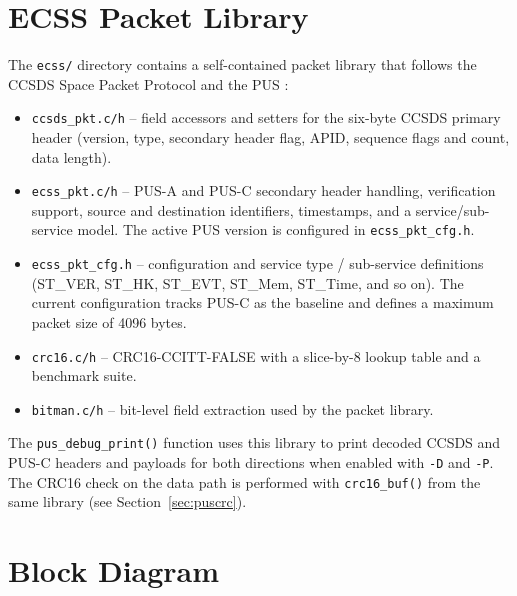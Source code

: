 \section{ECSS Packet Library}

The \texttt{ecss/} directory contains a self-contained packet library that
follows the CCSDS Space Packet Protocol \cite{CCSDS133} and the \gls{PUS}
\cite{ECSS7041C}:

\begin{itemize}

\item \texttt{ccsds\_pkt.c/h} -- field accessors and setters for the
six-byte CCSDS primary header (version, type, secondary header flag, APID,
sequence flags and count, data length).\\

\item \texttt{ecss\_pkt.c/h} -- PUS-A and PUS-C secondary header handling,
verification support, source and destination identifiers, timestamps, and a
service/sub-service model. The active PUS version is configured in
\texttt{ecss\_pkt\_cfg.h}.\\

\item \texttt{ecss\_pkt\_cfg.h} -- configuration and service type /
sub-service definitions (ST\_VER, ST\_HK, ST\_EVT, ST\_Mem, ST\_Time, and so
on). The current configuration tracks PUS-C as the baseline and defines a
maximum packet size of 4096 bytes.\\

\item \texttt{crc16.c/h} -- CRC16-CCITT-FALSE with a slice-by-8 lookup table
and a benchmark suite.\\

\item \texttt{bitman.c/h} -- bit-level field extraction used by the packet
library.\\

\end{itemize}

\noindent
The \texttt{pus\_debug\_print()} function uses this library to print decoded
CCSDS and PUS-C headers and payloads for both directions when enabled with
\texttt{-D} and \texttt{-P}. The CRC16 check on the data path is performed
with \texttt{crc16\_buf()} from the same library (see
Section~\ref{sec:puscrc}).

\section{Block Diagram}

